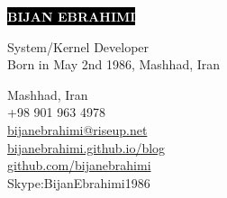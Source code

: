 \documentclass[12pt]{developercv}
\begin{document}
\begin{minipage}[t]{0.65\textwidth} %
	\vspace{-\baselineskip} %
	
	\colorbox{black}{{\HUGE\textcolor{white}{\textbf{\MakeUppercase{Bijan Ebrahimi}}}}} %
	
	\vspace{6pt}
	
	{\huge System/Kernel Developer}\\ %
	{Born in May 2nd 1986, Mashhad, Iran}
\end{minipage}
\begin{minipage}[t]{0.35\textwidth} %
	\vspace{-\baselineskip} %
	
	{Mashhad, Iran}\\
	{+98 901 963 4978}\\
	{\href{mailto:bijanebrahimi@riseup.net}{bijanebrahimi@riseup.net}}\\	
	{\href{https://bijanebrahimi.github.io/blog}{bijanebrahimi.github.io/blog}}\\
	{\href{https://github.com/bijanebrahimi}{github.com/bijanebrahimi}}\\
	{{Skype:BijanEbrahimi1986}}
\end{minipage}

\vspace{0.5cm}


\end{document}
